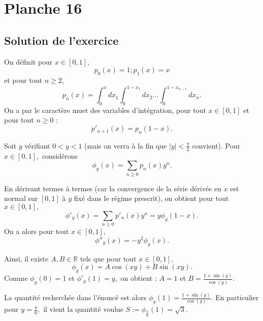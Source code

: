 \chapter{Planche 16}

\section{Solution de l'exercice}

On définit pour $x\in[0,1],$ $$p_{0}(x)=1;p_{1}(x)=x$$et pour tout $n\geq 2,$ $$p_{n}(x)=\int_{0}^{x}dx_{1}\int_{0}^{1-x_{1}}dx_{2}\ldots\int_{0}^{1-x_{n-1}}dx_{n}.$$
On a par le caractère muet des variables d'intégration, pour tout $x\in[0,1]$ et pour tout $n\geq 0$ : $$p'_{n+1}(x)=p_{n}(1-x).$$

Soit $y$ vérifiant $0<y<1$ (mais on verra à la fin que $\vert y\vert <\frac{\pi}{2}$ convient).
Pour $x\in[0,1],$ considérons $$\phi_{y}(x)=\sum_{n\geq 0}p_{n}(x)y^{n}.$$

En dérivant termes à termes (car la convergence de la série dérivée en $x$ est normal sur $[0,1]$ à $y$ fixé dans le régime prescrit), 
on obtient pour tout $x\in[0,1],$ $$\phi'_{y}(x)=\sum_{n\geq 0}p'_{n}(x)y^{n}=y\phi_{y}(1-x).$$
On a alors pour tout $x\in[0,1],$ $$ \phi''_{y}(x)=-y^{2}\phi_{y}(x).$$

Ainsi, il existe $A,B\in\mathbb{R}$ tels que pour tout $x\in[0,1],$ $$ \phi_{y}(x)=A\cos(xy)+B\sin(xy).$$
Comme $\phi_{y}(0)=1$ et $\phi'_{y}(1)=y,$ on obtient : $A=1$ et $\displaystyle B=\frac{1+\sin(y)}{\cos(y)}.$

La quantité recherchée dans l'énoncé est alors $\displaystyle \phi_{y}(1)=\frac{1+\sin(y)}{\cos(y)}.$
En particulier pour $\displaystyle y=\frac{\pi}{6},$ il vient la quantité voulue $\displaystyle S:=\phi_{\frac{\pi}{6}}(1)=\sqrt{3}.$
